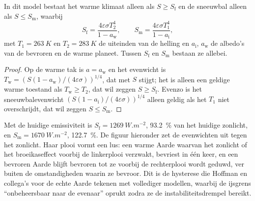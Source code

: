 \begin{proposition}[Kantelpunten]\label{prop:b2:precambrian-earth:tipping}
In dit model bestaat het warme klimaat alleen als $S \ge S_{\text{f}}$ en de sneeuwbal alleen als
$S \le S_{\text{m}}$, waarbij
\[
  S_{\text{f}} = \frac{4\varepsilon\sigma T_2^4}{1 - a_{\text{w}}}, \qquad
  S_{\text{m}} = \frac{4\varepsilon\sigma T_1^4}{1 - a_{\text{i}}},
\]
met $T_1 = \qty{263}{K}$ en $T_2 = \qty{283}{K}$ de uiteinden van de helling en $a_{\text{i}}$,
$a_{\text{w}}$ de albedo's van de bevroren en de warme planeet. Tussen $S_{\text{f}}$ en
$S_{\text{m}}$ bestaan ze allebei.
\end{proposition}

\begin{proof}
Op de warme tak is $a = a_{\text{w}}$ en het evenwicht is $T_{\text{w}} = (S(1 -
a_{\text{w}})/(4\varepsilon\sigma))^{1/4}$, dat met $S$ stijgt; het is alleen een geldige warme toestand
als $T_{\text{w}} \ge T_2$, dat wil zeggen $S \ge S_{\text{f}}$. Evenzo is het sneeuwbalevenwicht
$(S(1 - a_{\text{i}})/(4\varepsilon\sigma))^{1/4}$ alleen geldig als het $T_1$ niet overschrijdt, dat
wil zeggen $S \le S_{\text{m}}$.
\end{proof}

Met de huidige emissiviteit is $S_{\text{f}} = \qty{1269}{W.m^{-2}}$, \qty{93.2}{\percent} van het huidige
zonlicht, en $S_{\text{m}} = \qty{1670}{W.m^{-2}}$, \qty{122.7}{\percent}. De figuur hieronder
zet de evenwichten uit tegen het zonlicht. Haar plooi vormt een lus: een warme Aarde waarvan het zonlicht
of het broeikaseffect voorbij de linkerplooi verzwakt, bevriest in één keer, en een bevroren Aarde blijft bevroren
tot ze voorbij de rechterplooi wordt geduwd, ver buiten de omstandigheden waarin ze bevroor. Dit is
de hysterese die Hoffman en collega's voor de echte Aarde tekenen met vollediger modellen,
waarbij de ijsgrens ``onbeheersbaar naar de evenaar'' oprukt zodra ze de
instabiliteitsdrempel bereikt.

